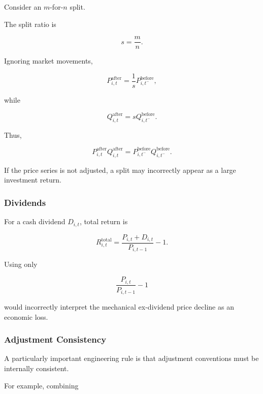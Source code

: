 \documentclass[11pt,a4paper]{article}
\begin{document}
Consider an $m$-for-$n$ split.

The split ratio is

\begin{equation}
s
=
\frac{m}{n}.
\end{equation}

Ignoring market movements,

\begin{equation}
P_{i,t}^{\mathrm{after}}
=
\frac{1}{s}
P_{i,t^-}^{\mathrm{before}},
\end{equation}

while

\begin{equation}
Q_{i,t}^{\mathrm{after}}
=
s
Q_{i,t^-}^{\mathrm{before}}.
\end{equation}

Thus,

\begin{equation}
P_{i,t}^{\mathrm{after}}
Q_{i,t}^{\mathrm{after}}
=
P_{i,t^-}^{\mathrm{before}}
Q_{i,t^-}^{\mathrm{before}}.
\end{equation}

If the price series is not adjusted, a split may incorrectly appear as a large
investment return.


\subsubsection{Dividends}

For a cash dividend $D_{i,t}$, total return is

\begin{equation}
\boxed{
R_{i,t}^{\mathrm{total}}
=
\frac{
P_{i,t}
+
D_{i,t}
}{
P_{i,t-1}
}
-1.
}
\end{equation}

Using only

\begin{equation}
\frac{P_{i,t}}{P_{i,t-1}}-1
\end{equation}

would incorrectly interpret the mechanical ex-dividend price decline as an
economic loss.


\subsubsection{Adjustment Consistency}

A particularly important engineering rule is that adjustment conventions must
be internally consistent.

For example, combining
\end{document}
